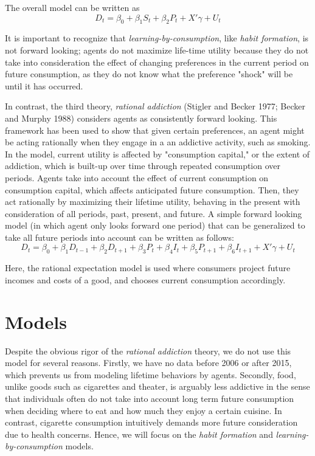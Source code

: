 \documentclass[Journal,letterpaper, NoLineNumbers]{ascelike-new}
\begin{document}
The overall model can be written as
\[D_{t} = \beta_0 + \beta_1S_{t} + \beta_2P_{t} + X'\gamma + U_t\]

It is important to recognize that \textit{learning-by-consumption}, like \textit{habit formation}, is not forward looking; agents do not maximize life-time utility because they do not take into consideration the effect of changing preferences in the current period on future consumption, as they do not know what the preference "shock" will be until it has occurred. 

In contrast, the third theory, \textit{rational addiction} (Stigler and Becker 1977; Becker and Murphy 1988) considers agents as consistently forward looking. This framework has been used to show that given certain preferences, an agent might be acting rationally when they engage in a an addictive activity, such as smoking. In the model, current utility is affected by "consumption capital," or the extent of addiction, which is built-up over time through repeated consumption over periods. Agents take into account the effect of current consumption on consumption capital, which affects anticipated future consumption. Then, they act rationally by maximizing their lifetime utility, behaving in the present with consideration of all periods, past, present, and future.  A simple forward looking model (in which agent only looks forward one period) that can be generalized to take all future periods into account can be written as follows: 
\[D_{t} = \beta_0 + \beta_1D_{t-1} + \beta_2D_{t+1} + \beta_3P_{t} + \beta_4I_{t} + \beta_5P_{t+1} + \beta_6I_{t+1} + X'\gamma + U_t\]

Here, the rational expectation model is used where consumers project future incomes and costs of a good, and chooses current consumption accordingly. 

\section{Models}

Despite the obvious rigor of the \textit{rational addiction} theory, we do not use this model for several reasons. Firstly, we have no data before 2006 or after 2015, which prevents us from modeling lifetime behaviors by agents. Secondly, food, unlike goods such as cigarettes and theater, is arguably less addictive in the sense that individuals often do not take into account long term future consumption when deciding where to eat and how much they enjoy a certain cuisine. In contrast, cigarette consumption intuitively demands more future consideration due to health concerns. Hence, we will focus on the \textit{habit formation} and \textit{learning-by-consumption} models.
\end{document}
